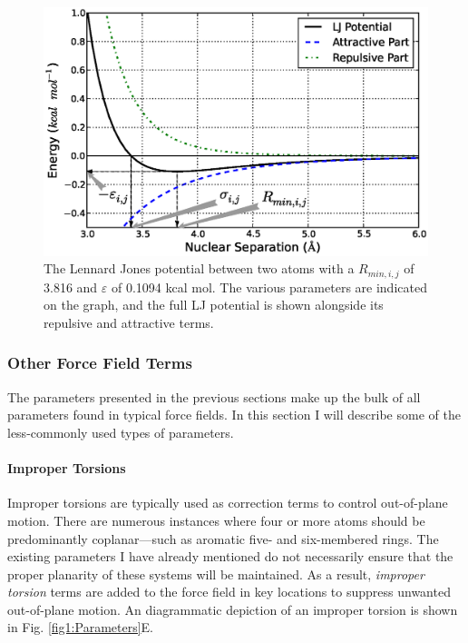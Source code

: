 \begin{figure}
   \includegraphics[width=6.5in]{LennardJones.ps}
   \caption{The Lennard Jones potential between two atoms with a $R_{min,i,j}$
            of 3.816 \text{\AA} and $\varepsilon$ of 0.1094 kcal mol.
            The various parameters are indicated on the graph, and the full LJ
            potential is shown alongside its repulsive and attractive terms.}
   \label{fig1:LennardJones}
\end{figure}

\subsubsection{Other Force Field Terms}

The parameters presented in the previous sections make up the bulk of all
parameters found in typical force fields. In this section I will describe some
of the less-commonly used types of parameters.

\paragraph{Improper Torsions}

Improper torsions are typically used as correction terms to control out-of-plane
motion. There are numerous instances where four or more atoms should be
predominantly coplanar---such as aromatic five- and six-membered rings. The
existing parameters I have already mentioned do not necessarily ensure that the
proper planarity of these systems will be maintained. As a result,
\emph{improper torsion} terms are added to the force field in key locations to
suppress unwanted out-of-plane motion. An diagrammatic depiction of an improper
torsion is shown in Fig. \ref{fig1:Parameters}E.

